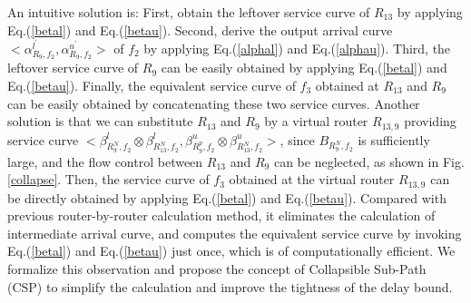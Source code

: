 \documentclass[10pt,journal]{IEEEtran}
\begin{document}
An intuitive solution is: First, obtain the leftover service curve of $R_{13}$ by applying Eq.(\ref{betal}) and Eq.(\ref{betau}). Second, derive the output arrival curve $<\alpha_{R_{9},f_2}^{l^\prime},\alpha_{R_{9},f_2}^{u^\prime}>$ of $f_2$ by applying Eq.(\ref{alphal}) and Eq.(\ref{alphau}). Third, the leftover service curve of $R_9$ can be easily obtained by applying Eq.(\ref{betal}) and Eq.(\ref{betau}). Finally, the equivalent service curve of $f_3$ obtained at $R_{13}$ and $R_9$ can be easily obtained by concatenating these two service curves. Another solution is that we can substitute $R_{13}$ and $R_{9}$ by a virtual router $R_{13,9}$ providing service curve $<\beta_{R_{9}^N,f_2}^l\otimes\beta_{R_{13}^N,f_2}^l,\beta_{R_{9}^{p},f_2}^u\otimes\beta_{R_{13}^N,f_2}^u>$, since $B_{R_9^N,f_2}$ is sufficiently large, and the flow control between $R_{13}$ and $R_9$ can be neglected, as shown in Fig. \ref{collapse}. Then, the service curve of $f_3$ obtained at the virtual router $R_{13,9}$ can be directly obtained by applying Eq.(\ref{betal}) and Eq.(\ref{betau}). Compared with previous router-by-router calculation method, it eliminates the calculation of intermediate arrival curve, and computes the equivalent service curve by invoking Eq.(\ref{betal}) and Eq.(\ref{betau}) just once, which is of computationally efficient. We formalize this observation and propose the concept of Collapsible Sub-Path (CSP) to simplify the calculation and improve the tightness of the delay bound.
\end{document}
